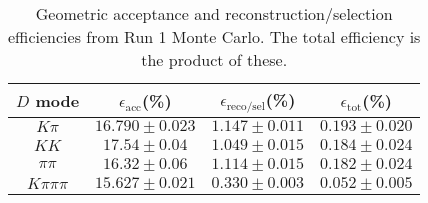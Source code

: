 \begin{table}[H]
    \centering
    \begin{tabular}{cccc}
        \toprule
        $D$ mode & $\epsilon_\mathrm{acc}$(\%) &  $\epsilon_\mathrm{reco/sel}$(\%) &  $\epsilon_\mathrm{tot}$(\%) \\
        \midrule
        $K\pi$ & $16.790 \pm 0.023$ & $1.147 \pm 0.011$ & $0.193 \pm 0.020$ \\
        $KK$ & $17.54 \pm 0.04$ & $1.049 \pm 0.015$ & $0.184 \pm 0.024$ \\
        $\pi\pi$ & $16.32 \pm 0.06$ & $1.114 \pm 0.015$ & $0.182 \pm 0.024$ \\
        $K\pi\pi\pi$ & $15.627 \pm 0.021$ & $0.330 \pm 0.003$ & $0.052 \pm 0.005$ \\
        \bottomrule
    \end{tabular}
    \caption{Geometric acceptance and reconstruction/selection efficiencies from  Run 1 Monte Carlo. The total efficiency is the  product of these.}
\label{tab:selection_efficiency_run1}
\end{table}
